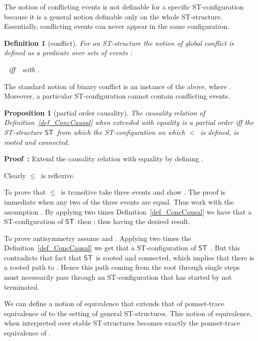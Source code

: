 \documentclass[submission,copyright,creativecommons]{eptcs}
\newtheorem{proposition}[theorem]{Proposition}
\newtheorem{definition}[theorem]{Definition}
\newenvironment{proof}[1][\!\!\,]{\vspace{1ex}\noindent\textbf{Proof #1: }}{\hfill\vspace{2ex}}
\newcommand\ST{\ensuremath{\mathsf{ST}}}
\newcommand\causes{\ensuremath{<}}
\newcommand\causeseq{\ensuremath{\leq}}
\begin{document}
The notion of conflicting events is not definable for a specific ST-configuration because it is a general notion definable only on the whole ST-structure. Essentially, conflicting events can never appear in the same configuration.

\begin{definition}[conflict]\label{def_conflict}
For an ST-structure  the notion of \emph{global conflict} is defined as a predicate over sets of events : 

\centerline{\,\ iff\ \, with .}
\end{definition}

The standard notion of binary conflict is an instance of the above, where .
Moreover, a particular ST-configuration cannot contain conflicting events.


\begin{proposition}[partial order causality]\label{prop_partialOrderCausality}
The causality relation of Definition~\ref{def_ConcCausal} when extended with equality is a partial order iff the ST-structure \ST\ from which the ST-configuration  on which \causes\ is defined, is rooted and connected.
\end{proposition}

\begin{proof}
Extend the causality relation with equality by defining .

Clearly \causeseq\ is reflexive.

To prove that \causeseq\ is transitive take three events  and show . The proof is immediate when any two of the three events are equal. Thus work with the assumption . By applying two times Definition~\ref{def_ConcCausal} we have that  a ST-configuration of \ST\ then ; thus having the desired result.

To prove antisymmetry assume  and . Applying two times the Definition~\ref{def_ConcCausal} we get that  a ST-configuration of \ST\ . But this contradicts that fact that \ST\ is rooted and connected, which implies that there is a rooted path to . Hence this path coming from the root through single steps must necessarily pass through an ST-configuration that has  started by not terminated.
\end{proof}



We can define a notion of equivalence that extends that of pomset-trace equivalence of \cite{GlabbeekV97splitting,GlabbeekG01refinement} to the setting of general ST-structures. This notion of equivalence, when interpreted over stable ST-structures becomes exactly the pomset-trace equivalence of \cite{GlabbeekG01refinement}.
\end{document}

